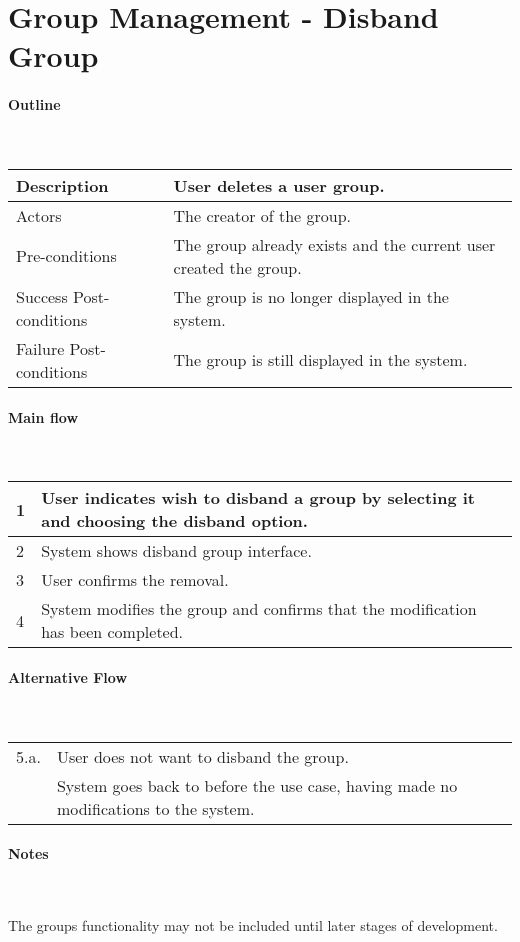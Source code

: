\section*{Group Management - Disband Group} %

\paragraph*{Outline} \

\begin{tabular}{ | l | l | }
\hline
Description & User deletes a user group. \\ \hline
Actors & The creator of the group. \\ \hline
Pre-conditions & The group already exists and the current user created the group. \\ \hline
Success Post-conditions & The group is no longer displayed in the system. \\ \hline
Failure Post-conditions & The group is still displayed in the system. \\ \hline
\end{tabular}


\paragraph*{Main flow} \

\begin{tabular}{ | l | l | } \hline
1 & User indicates wish to disband a group by selecting it and choosing the disband option. \\ \hline
2 & System shows disband group interface. \\ \hline
3 & User confirms the removal. \\ \hline
4 & System modifies the group and confirms that the modification has been completed. \\ \hline
\end{tabular}


\paragraph*{Alternative Flow} \

\begin{tabular}{ | l | l | } \hline
5.a. & User does not want to disband the group. \\
     & System goes back to before the use case, having made no modifications to the system.\\ \hline
\end{tabular}

\paragraph*{Notes} \

The groups functionality may not be included until later stages of development.
